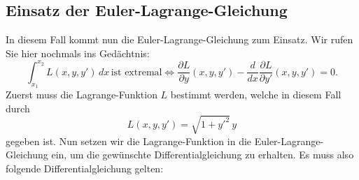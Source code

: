 \subsection{Einsatz der Euler-Lagrange-Gleichung
\label{kettenlinie:subsection:Einsatz der Euler-Lagrange-Gleichung}}
In diesem Fall kommt nun die Euler-Lagrange-Gleichung zum Einsatz.
Wir rufen Sie hier nochmals ins Gedächtnis:
\begin{equation}
	\int_{x_1}^{x_2} L(x, y, y') \, dx \, \text{ist extremal} \iff \frac{\partial L}{\partial y}(x, y, y') - \frac{d}{dx} \frac{\partial L}{\partial y'}(x, y, y') = 0.
\end{equation}
Zuerst muss die Lagrange-Funktion \(L\) bestimmt werden, welche in diesem Fall durch
\begin{equation}
	L(x, y, y')
	=
	\sqrt{1 + y'^2} \, y
\end{equation}
gegeben ist.
Nun setzen wir die Lagrange-Funktion in die Euler-Lagrange-Gleichung ein, um die gewünschte Differentialgleichung zu erhalten. Es muss also folgende Differentialgleichung gelten:

